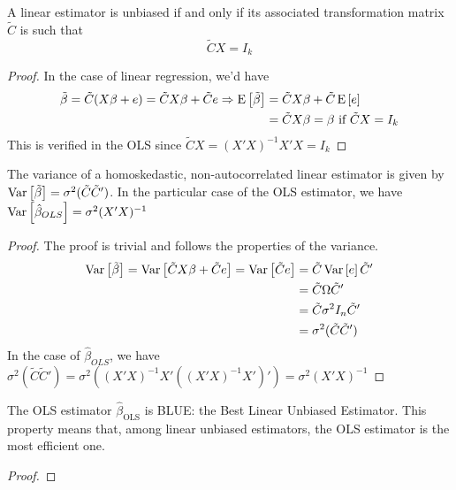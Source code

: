 \begin{remark}
A linear estimator is unbiased if and only if its associated transformation matrix $\tilde{C}$ is such that $$\tilde{C}X = I_k$$
\end{remark}
\begin{proof}
In the case of linear regression, we'd have \begin{align*}
\tilde{\beta} = \tilde{C}(X\beta + e) = \tilde{C}X\beta + \tilde{C}e \Rightarrow \operatorname{E}\left[\tilde{\beta}\right] & = \tilde{C}X\beta + \tilde{C}\operatorname{E}\left[e\right] \\
& = \tilde{C}X\beta = \beta \text{ if } \tilde{C}X = I_k
\end{align*}This is verified in the OLS since $\tilde{C}X = (X'X)^{-1}X'X = I_k$
\end{proof}

\begin{remark}
The variance of a homoskedastic, non-autocorrelated linear estimator is given by $\operatorname{Var}\left[\tilde{\beta}\right] =  \sigma^2(\tilde{C}\tilde{C}')$. In the particular case of the OLS estimator, we have $\operatorname{Var}\left[\hat{\beta}_{OLS}\right] = \sigma^2(X'X)^{-1}$
\end{remark}
\begin{proof}
The proof is trivial and follows the properties of the variance.
\begin{align*}
\operatorname{Var}\left[\tilde{\beta}\right] = \operatorname{Var}\left[\tilde{C}X\beta + \tilde{C}e\right] = \operatorname{Var}\left[\tilde{C}e\right] & = \tilde{C}\operatorname{Var}\left[e\right]\tilde{C}'\\
& = \tilde{C}\Omega\tilde{C}'\\
& = \tilde{C}\sigma^2 I_n\tilde{C}'\\
& = \sigma^2(\tilde{C}\tilde{C}')
\end{align*}
In the case of $\hat\beta_{OLS}$, we have $\sigma^2(\tilde{C}\tilde{C}') = \sigma^2((X'X)^{-1}X'((X'X)^{-1}X')') = \sigma^2(X'X)^{-1}$
\end{proof}

\begin{remark}
The OLS estimator $\hat{\beta}_{\text{OLS}}$ is BLUE: the Best Linear Unbiased Estimator. This property means that, among linear unbiased estimators, the OLS estimator is the most efficient one.
\end{remark}
\begin{proof}

\end{proof}

